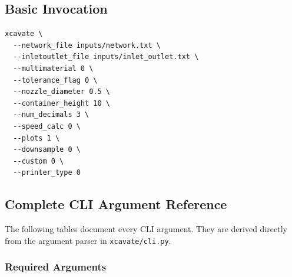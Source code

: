 \documentclass[11pt,letterpaper]{article}
\newcommand{\code}[1]{\texttt{#1}}
\begin{document}
\subsection{Basic Invocation}

\begin{lstlisting}
xcavate \
  --network_file inputs/network.txt \
  --inletoutlet_file inputs/inlet_outlet.txt \
  --multimaterial 0 \
  --tolerance_flag 0 \
  --nozzle_diameter 0.5 \
  --container_height 10 \
  --num_decimals 3 \
  --speed_calc 0 \
  --plots 1 \
  --downsample 0 \
  --custom 0 \
  --printer_type 0
\end{lstlisting}

\subsection{Complete CLI Argument Reference}

\begin{claudebox}
The following tables document every CLI argument. They are derived directly
from the argument parser in \code{xcavate/cli.py}.
\end{claudebox}

\subsubsection{Required Arguments}
\end{document}
